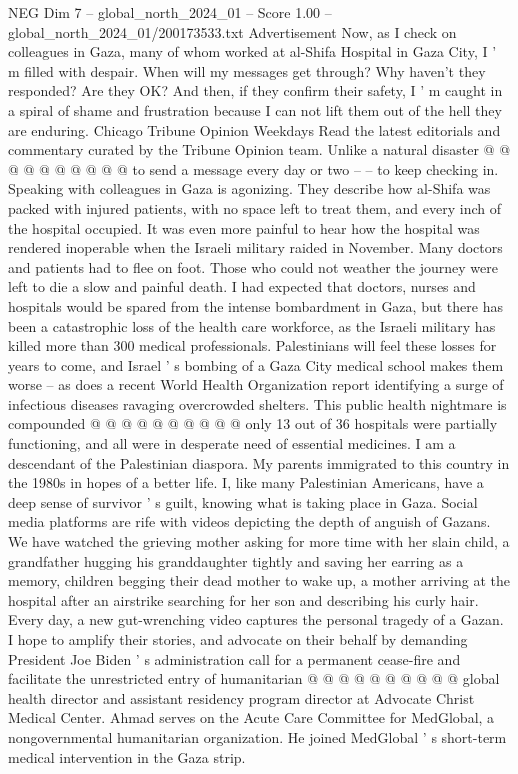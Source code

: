 \begin{textsample}{NEG Dim 7 – global\_north\_2024\_01 – Score 1.00 – global\_north\_2024\_01/200173533.txt}
Advertisement Now, as I check on colleagues in Gaza, many of whom worked at al-Shifa Hospital in Gaza City, I ' m filled with despair.
When will my messages get through?
Why haven't they responded?
Are they OK?
And then, if they confirm their safety, I ' m caught in a spiral of shame and frustration because I can not lift them out of the hell they are enduring.
Chicago Tribune Opinion Weekdays Read the latest editorials and commentary curated by the Tribune Opinion team.
Unlike a natural disaster @ @ @ @ @ @ @ @ @ @ to send a message every day or two -- -- to keep checking in.
Speaking with colleagues in Gaza is agonizing.
They describe how al-Shifa was packed with injured patients, with no space left to treat them, and every inch of the hospital occupied.
It was even more painful to hear how the hospital was rendered inoperable when the Israeli military raided in November.
Many doctors and patients had to flee on foot.
Those who could not weather the journey were left to die a slow and painful death.
I had expected that doctors, nurses and hospitals would be spared from the intense bombardment in Gaza, but there has been a catastrophic loss of the health care workforce, as the Israeli military has killed more than 300 medical professionals.
Palestinians will feel these losses for years to come, and Israel ' s bombing of a Gaza City medical school makes them worse -- as does a recent World Health Organization report identifying a surge of infectious diseases ravaging overcrowded shelters.
This public health nightmare is compounded @ @ @ @ @ @ @ @ @ @ only 13 out of 36 hospitals were partially functioning, and all were in desperate need of essential medicines.
I am a descendant of the Palestinian diaspora.
My parents immigrated to this country in the 1980s in hopes of a better life.
I, like many Palestinian Americans, have a deep sense of survivor ' s guilt, knowing what is taking place in Gaza.
Social media platforms are rife with videos depicting the depth of anguish of Gazans.
We have watched the grieving mother asking for more time with her slain child, a grandfather hugging his granddaughter tightly and saving her earring as a memory, children begging their dead mother to wake up, a mother arriving at the hospital after an airstrike searching for her son and describing his curly hair.
Every day, a new gut-wrenching video captures the personal tragedy of a Gazan.
I hope to amplify their stories, and advocate on their behalf by demanding President Joe Biden ' s administration call for a permanent cease-fire and facilitate the unrestricted entry of humanitarian @ @ @ @ @ @ @ @ @ @ global health director and assistant residency program director at Advocate Christ Medical Center.
Ahmad serves on the Acute Care Committee for MedGlobal, a nongovernmental humanitarian organization.
He joined MedGlobal ' s short-term medical intervention in the Gaza strip.

\end{textsample}
